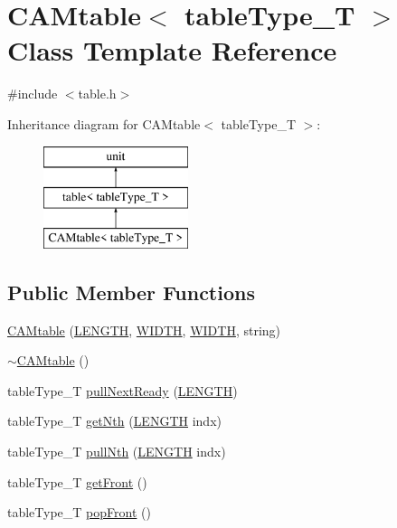 \hypertarget{classCAMtable}{
\section{CAMtable$<$ tableType\_\-T $>$ Class Template Reference}
\label{classCAMtable}
}


{\ttfamily \#include $<$table.h$>$}

Inheritance diagram for CAMtable$<$ tableType\_\-T $>$:\begin{figure}[H]
\begin{center}
\leavevmode
\includegraphics[height=3.000000cm]{classCAMtable}
\end{center}
\end{figure}
\subsection*{Public Member Functions}
\begin{DoxyCompactItemize}
\item 
\hyperlink{classCAMtable_a45eb83cb39ff8272d50612a1f5f6f85b}{CAMtable} (\hyperlink{global_2global_8h_ad7ec63c69447a2b630929c8e0197860d}{LENGTH}, \hyperlink{global_2global_8h_a6fa2e24b8a418fa215e183264cbea3aa}{WIDTH}, \hyperlink{global_2global_8h_a6fa2e24b8a418fa215e183264cbea3aa}{WIDTH}, string)
\item 
\hyperlink{classCAMtable_a5d8003f0fb86c270c65674efa53b1172}{$\sim$CAMtable} ()
\item 
tableType\_\-T \hyperlink{classCAMtable_a07cd94cd88b502e5b0e2699b8762f560}{pullNextReady} (\hyperlink{global_2global_8h_ad7ec63c69447a2b630929c8e0197860d}{LENGTH})
\item 
tableType\_\-T \hyperlink{classCAMtable_abef54f1e30ed42845d48c98917de32e1}{getNth} (\hyperlink{global_2global_8h_ad7ec63c69447a2b630929c8e0197860d}{LENGTH} indx)
\item 
tableType\_\-T \hyperlink{classCAMtable_a9644548c43e912d1cd1d0431fc5179e9}{pullNth} (\hyperlink{global_2global_8h_ad7ec63c69447a2b630929c8e0197860d}{LENGTH} indx)
\item 
tableType\_\-T \hyperlink{classCAMtable_a1111b552094db836302ac5ce0671794a}{getFront} ()
\item 
tableType\_\-T \hyperlink{classCAMtable_a5e19b284c54893d488fb7eae5f84aa13}{popFront} ()
\end{DoxyCompactItemize}
